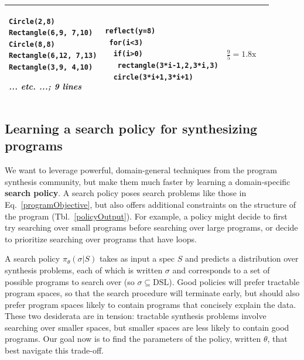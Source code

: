 \documentclass{article}
\theoremstyle{definition}
\begin{document}
\begin{table}[t]
\begin{tabular}{m{1.5cm}llc}
\begin{minipage}{\exampleTraceSize}\begin{lstlisting}
Circle(2,8)
Rectangle(6,9, 7,10)
Circle(8,8)
Rectangle(6,12, 7,13)
Rectangle(3,9, 4,10)
\end{lstlisting}\small\emph{... etc. ...; 9 lines}
  \end{minipage}&\begin{minipage}{\exampleProgramSize}
\begin{lstlisting}
reflect(y=8)
 for(i<3)
  if(i>0)
   rectangle(3*i-1,2,3*i,3)
  circle(3*i+1,3*i+1)
\end{lstlisting}
\end{minipage}&$\frac{9}{5} = 1.8\text{x}$ \\\bottomrule
  \end{tabular}
  \end{table}

\subsection{Learning a search policy for synthesizing programs}\label{learningASearchPolicy}

We want to leverage powerful, domain-general techniques from the program synthesis community,
but make them much faster by
learning a domain-specific \textbf{search policy}.
A search policy poses search problems
like those in Eq.~\ref{programObjective},
but also offers additional constraints on the structure of the program (Tbl.~\ref{policyOutput}).
For example, a policy might decide to first try searching over small programs before searching over large programs,
or decide to prioritize searching over programs that have loops.

A search policy $\pi_\theta(\sigma  | S )$ takes as input a spec $S$ and predicts a distribution over synthesis problems, each of which is written $\sigma $ and corresponds to a set of possible programs to search over (so $\sigma \subseteq \text{DSL}$).
Good policies will prefer tractable program spaces,
so that the search procedure will terminate early, 
but should also prefer program spaces likely to contain
programs that concisely explain the data.
These two desiderata are in tension:
tractable synthesis problems involve searching over smaller spaces,
but smaller spaces are less likely to contain good programs.
Our goal now is to find the parameters of the policy, written $\theta$, that best navigate this trade-off.
\end{document}
